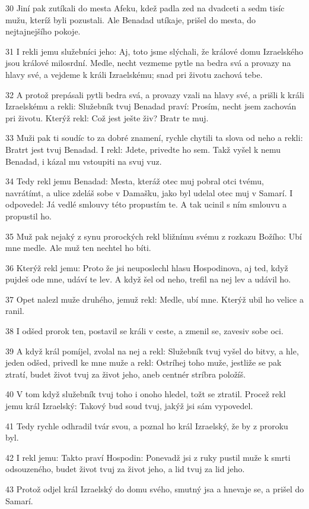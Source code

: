 \par 30 Jiní pak zutíkali do mesta Afeku, kdež padla zed na dvadceti a sedm tisíc mužu, kteríž byli pozustali. Ale Benadad utíkaje, prišel do mesta, do nejtajnejšího pokoje.
\par 31 I rekli jemu služebníci jeho: Aj, toto jsme slýchali, že králové domu Izraelského jsou králové milosrdní. Medle, necht vezmeme pytle na bedra svá a provazy na hlavy své, a vejdeme k králi Izraelskému; snad pri životu zachová tebe.
\par 32 A protož prepásali pytli bedra svá, a provazy vzali na hlavy své, a prišli k králi Izraelskému a rekli: Služebník tvuj Benadad praví: Prosím, necht jsem zachován pri životu. Kterýž rekl: Což jest ješte živ? Bratr te muj.
\par 33 Muži pak ti soudíc to za dobré znamení, rychle chytili ta slova od neho a rekli: Bratrt jest tvuj Benadad. I rekl: Jdete, privedte ho sem. Takž vyšel k nemu Benadad, i kázal mu vstoupiti na svuj vuz.
\par 34 Tedy rekl jemu Benadad: Mesta, kteráž otec muj pobral otci tvému, navrátímt, a ulice zdeláš sobe v Damašku, jako byl udelal otec muj v Samarí. I odpovedel: Já vedlé smlouvy této propustím te. A tak ucinil s ním smlouvu a propustil ho.
\par 35 Muž pak nejaký z synu prorockých rekl bližnímu svému z rozkazu Božího: Ubí mne medle. Ale muž ten nechtel ho bíti.
\par 36 Kterýž rekl jemu: Proto že jsi neuposlechl hlasu Hospodinova, aj ted, když pujdeš ode mne, udáví te lev. A když šel od neho, trefil na nej lev a udávil ho.
\par 37 Opet nalezl muže druhého, jemuž rekl: Medle, ubí mne. Kterýž ubil ho velice a ranil.
\par 38 I odšed prorok ten, postavil se králi v ceste, a zmenil se, zavesiv sobe oci.
\par 39 A když král pomíjel, zvolal na nej a rekl: Služebník tvuj vyšel do bitvy, a hle, jeden odšed, privedl ke mne muže a rekl: Ostríhej toho muže, jestliže se pak ztratí, budet život tvuj za život jeho, aneb centnér stríbra položíš.
\par 40 V tom když služebník tvuj toho i onoho hledel, tožt se ztratil. Procež rekl jemu král Izraelský: Takový bud soud tvuj, jakýž jsi sám vypovedel.
\par 41 Tedy rychle odhradil tvár svou, a poznal ho král Izraelský, že by z proroku byl.
\par 42 I rekl jemu: Takto praví Hospodin: Ponevadž jsi z ruky pustil muže k smrti odsouzeného, budet život tvuj za život jeho, a lid tvuj za lid jeho.
\par 43 Protož odjel král Izraelský do domu svého, smutný jsa a hnevaje se, a prišel do Samarí.

